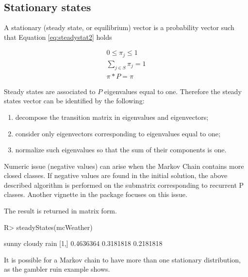 \documentclass[article,nojss]{jss}
\providecommand{\tightlist}{%
  \setlength{\itemsep}{0pt}\setlength{\parskip}{0pt}}
\begin{document}
\hypertarget{stationary-states}{%
\subsection{Stationary states}\label{stationary-states}}

A stationary (steady state, or equilibrium) vector is a probability vector such that Equation \ref{eq:steadystat2} holds

\begin{equation}
\begin{matrix}
0\leq \pi_j \leq 1\\ 
\sum_{j \in S} \pi_j=1\\ 
\pi*P=\pi
\end{matrix}
\label{eq:steadystat2}
\end{equation}

Steady states are associated to \(P\) eigenvalues equal to one. Therefore the steady states vector can be identified by the following:

\begin{enumerate}
\def\labelenumi{\arabic{enumi}.}
\tightlist
\item
  decompose the transition matrix in eigenvalues and eigenvectors;
\item
  consider only eigenvectors corresponding to eigenvalues equal to one;
\item
  normalize such eigenvalues so that the sum of their components is one.
\end{enumerate}

Numeric issue (negative values) can arise when the Markov Chain contains more closed classes. If negative values are found in the initial solution, the above described algorithm is performed on the submatrix corresponding to recurrent P classes. Another vignette in the package focuses on this issue.

The result is returned in matrix form.

\begin{CodeChunk}

\begin{CodeInput}
R> steadyStates(mcWeather)
\end{CodeInput}

\begin{CodeOutput}
         sunny    cloudy      rain
[1,] 0.4636364 0.3181818 0.2181818
\end{CodeOutput}
\end{CodeChunk}

It is possible for a Markov chain to have more than one stationary distribution, as the gambler ruin example shows.
\end{document}
